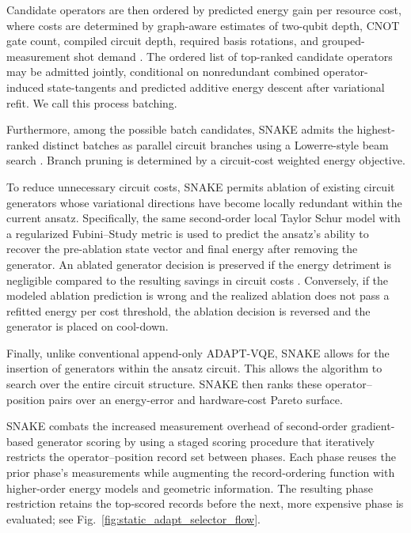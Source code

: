 \documentclass[
  reprint,
  amsmath,
  amssymb,
  aps,
  pra,
  nofootinbib,
  superscriptaddress,
  floatfix
]{revtex4-2}
\begin{document}
Candidate operators are then ordered by predicted energy gain per resource cost, where costs 
are determined by graph-aware estimates of two-qubit depth, CNOT gate count, compiled circuit depth, required basis rotations, and grouped-measurement shot demand \cite{Verteletskyi2020CliqueCover,Yen2020CompatibleMeasurements,Ikhtiarudin2025ShotEfficient}.
The ordered list of top-ranked candidate operators may be admitted jointly, conditional on nonredundant combined operator-induced state-tangents and predicted additive energy descent after variational refit. We call this process batching. 

Furthermore, among the possible batch candidates, \textsc{SNAKE} admits the highest-ranked distinct batches as parallel circuit branches using a Lowerre-style beam search \cite{Lowerre1976Beam}. Branch pruning is determined by a circuit-cost weighted energy objective.


To reduce unnecessary circuit costs, \textsc{SNAKE} permits ablation of existing circuit generators whose variational directions have become locally redundant within the current ansatz. Specifically, the same second-order local Taylor Schur model with a regularized Fubini--Study metric is used to predict the ansatz's ability to recover the pre-ablation state vector and final energy after removing the generator. An ablated generator decision is preserved if the energy detriment is negligible compared to the resulting savings in circuit costs \cite{Vaquero2025PrunedADAPT}. Conversely, if the modeled ablation prediction is wrong and the realized ablation does not pass a refitted energy per cost threshold, the ablation decision is reversed and the generator is placed on cool-down.

Finally, unlike conventional append-only ADAPT-VQE, \textsc{SNAKE} allows for the insertion of generators within the ansatz circuit. This allows the algorithm to search over the entire circuit structure. \textsc{SNAKE} then ranks these operator--position pairs over an energy-error and hardware-cost Pareto surface.

\textsc{SNAKE} combats the increased measurement overhead of second-order gradient-based generator scoring by using a staged scoring procedure that iteratively restricts the operator--position record set between phases. Each phase reuses the prior phase's measurements while augmenting the record-ordering function with higher-order energy models and geometric information. The resulting phase restriction retains the top-scored records before the next, more expensive phase is evaluated; see Fig.~\ref{fig:static_adapt_selector_flow}.
\end{document}

